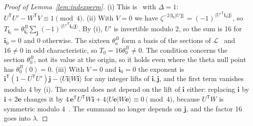 \documentclass[version=preprint]{iacrcc}
\begin{document}
\begin{proof}[Proof of Lemma~\ref{lem:indexperm}]
        (i) This is~\cite[Lemma 11]{Dar24} with $\Delta = 1$: $U^{\mathsf T} U' -
        W^{\mathsf T} V \equiv 1 \pmod 4$. (ii) With $V = 0$ we have
        $\zeta^{-2\langle \mathbf i_0 | U'\mathbf j\rangle} = (-1)^{\langle
            U'^{\mathsf T} \mathbf i_0 | \mathbf j \rangle}$, so $T_{\mathbf i_0} =
        \theta^B_{\mathbf i_0} \sum_{\mathbf j} (-1)^{\langle U'^{\mathsf T}
            \mathbf i_0 | \mathbf j\rangle}$. By (i), $U'$ is invertible modulo 2,
        so the sum is 16 for $\mathbf i_0 = 0$ and 0 otherwise. The sixteen
        $\theta^B_a$ form a basis of the sections of $\mathcal L$~\cite[Section
        2.4]{Dar24} and $16 \neq 0$ in odd characteristic, so $T_0 = 16
        \theta^B_0 \neq 0$. The condition concerns the section $\theta^B_0$, not
        its value at the origin, so it holds even where the theta null point has
        $\theta^B_0(0) = 0$. (iii) With $V = 0$ and $\mathbf i_0 = 0$ the exponent
        is $\mathbf i^{\mathsf T}(1 - U^{\mathsf T} U')\mathbf j - \langle
        U\mathbf i | W\mathbf i\rangle$ for any integer lifts of $\mathbf i,
        \mathbf j$, and the first term vanishes modulo 4 by (i). The second
        does not depend on the lift of $\mathbf i$ either: replacing $\mathbf i$
        by $\mathbf i + 2\mathbf e$ changes it by $4\,\mathbf e^{\mathsf T}
        U^{\mathsf T} W \mathbf i + 4 \langle U\mathbf e | W\mathbf e\rangle
        \equiv 0 \pmod 4$, because $U^{\mathsf T} W$
        is symmetric modulo 4~\cite[Lemma 11]{Dar24}. The summand no
        longer depends on $\mathbf j$, and the factor 16 goes into $\lambda$.
    \end{proof}
\end{document}
